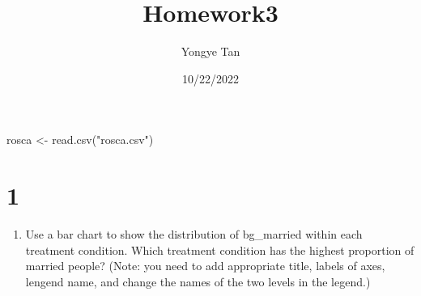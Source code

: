 \documentclass[
]{article}
\title{Homework3}
\author{Yongye Tan}
\date{10/22/2022}
\newenvironment{Shaded}{\begin{snugshade}}{\end{snugshade}}
\newcommand{\ConstantTok}[1]{\textcolor[rgb]{0.00,0.00,0.00}{#1}}
\newcommand{\DecValTok}[1]{\textcolor[rgb]{0.00,0.00,0.81}{#1}}
\newcommand{\FunctionTok}[1]{\textcolor[rgb]{0.00,0.00,0.00}{#1}}
\newcommand{\NormalTok}[1]{#1}
\newcommand{\OtherTok}[1]{\textcolor[rgb]{0.56,0.35,0.01}{#1}}
\newcommand{\SpecialCharTok}[1]{\textcolor[rgb]{0.00,0.00,0.00}{#1}}
\newcommand{\StringTok}[1]{\textcolor[rgb]{0.31,0.60,0.02}{#1}}
\providecommand{\tightlist}{%
  \setlength{\itemsep}{0pt}\setlength{\parskip}{0pt}}
\begin{document}
\maketitle

\begin{Shaded}
\begin{Highlighting}[]
\NormalTok{rosca }\OtherTok{\textless{}{-}} \FunctionTok{read.csv}\NormalTok{(}\StringTok{"rosca.csv"}\NormalTok{)}
\end{Highlighting}
\end{Shaded}

\begin{Shaded}
\end{Shaded}

\hypertarget{section}{%
\section{1}\label{section}}

\begin{enumerate}
\def\labelenumi{\alph{enumi}.}
\tightlist
\item
  Use a bar chart to show the distribution of bg\_married within each
  treatment condition. Which treatment condition has the highest
  proportion of married people? (Note: you need to add appropriate
  title, labels of axes, lengend name, and change the names of the two
  levels in the legend.)
\end{enumerate}
\end{document}
